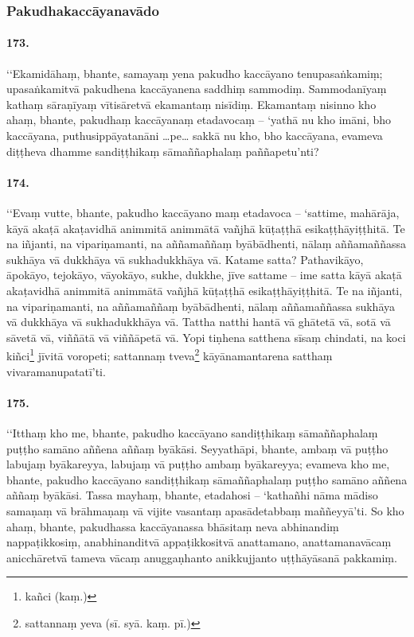 \subsubsection{Pakudhakaccāyanavādo}

\paragraph{173.} ‘‘Ekamidāhaṃ, bhante, samayaṃ yena pakudho kaccāyano tenupasaṅkamiṃ; upasaṅkamitvā pakudhena kaccāyanena saddhiṃ sammodiṃ. Sammodanīyaṃ kathaṃ sāraṇīyaṃ vītisāretvā ekamantaṃ nisīdiṃ. Ekamantaṃ nisinno kho ahaṃ, bhante, pakudhaṃ kaccāyanaṃ etadavocaṃ – ‘yathā nu kho imāni, bho kaccāyana, puthusippāyatanāni …pe… sakkā nu kho, bho kaccāyana, evameva diṭṭheva dhamme sandiṭṭhikaṃ sāmaññaphalaṃ paññapetu’nti?

\paragraph{174.} ‘‘Evaṃ vutte, bhante, pakudho kaccāyano maṃ etadavoca – ‘sattime, mahārāja, kāyā akaṭā akaṭavidhā animmitā animmātā vañjhā kūṭaṭṭhā esikaṭṭhāyiṭṭhitā. Te na iñjanti, na vipariṇamanti, na aññamaññaṃ byābādhenti, nālaṃ aññamaññassa sukhāya vā dukkhāya vā sukhadukkhāya vā. Katame satta? Pathavikāyo, āpokāyo, tejokāyo, vāyokāyo, sukhe, dukkhe, jīve sattame – ime satta kāyā akaṭā akaṭavidhā animmitā animmātā vañjhā kūṭaṭṭhā esikaṭṭhāyiṭṭhitā. Te na iñjanti, na vipariṇamanti, na aññamaññaṃ byābādhenti, nālaṃ aññamaññassa sukhāya vā dukkhāya vā sukhadukkhāya vā. Tattha natthi hantā vā ghātetā vā, sotā vā sāvetā vā, viññātā vā viññāpetā vā. Yopi tiṇhena satthena sīsaṃ chindati, na koci kiñci\footnote{kañci (kaṃ.)} jīvitā voropeti; sattannaṃ tveva\footnote{sattannaṃ yeva (sī. syā. kaṃ. pī.)} kāyānamantarena satthaṃ vivaramanupatatī’ti.

\paragraph{175.} ‘‘Itthaṃ kho me, bhante, pakudho kaccāyano sandiṭṭhikaṃ sāmaññaphalaṃ puṭṭho samāno aññena aññaṃ byākāsi. Seyyathāpi, bhante, ambaṃ vā puṭṭho labujaṃ byākareyya, labujaṃ vā puṭṭho ambaṃ byākareyya; evameva kho me, bhante, pakudho kaccāyano sandiṭṭhikaṃ sāmaññaphalaṃ puṭṭho samāno aññena aññaṃ byākāsi. Tassa mayhaṃ, bhante, etadahosi – ‘kathañhi nāma mādiso samaṇaṃ vā brāhmaṇaṃ vā vijite vasantaṃ apasādetabbaṃ maññeyyā’ti. So kho ahaṃ, bhante, pakudhassa kaccāyanassa bhāsitaṃ neva abhinandiṃ nappaṭikkosiṃ, anabhinanditvā appaṭikkositvā anattamano, anattamanavācaṃ anicchāretvā tameva vācaṃ anuggaṇhanto anikkujjanto uṭṭhāyāsanā pakkamiṃ.

